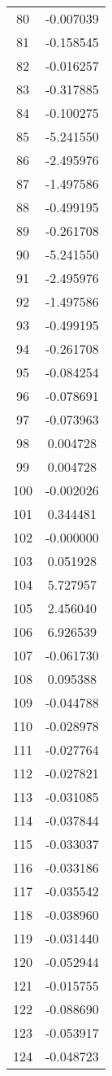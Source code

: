 \documentclass[12pt]{article}
\begin{document}
\begin{longtable}{@{}cc@{}}
80 & -0.007039 \\
81 & -0.158545 \\
82 & -0.016257 \\
83 & -0.317885 \\
84 & -0.100275 \\
85 & -5.241550 \\
86 & -2.495976 \\
87 & -1.497586 \\
88 & -0.499195 \\
89 & -0.261708 \\
90 & -5.241550 \\
91 & -2.495976 \\
92 & -1.497586 \\
93 & -0.499195 \\
94 & -0.261708 \\
95 & -0.084254 \\
96 & -0.078691 \\
97 & -0.073963 \\
98 & 0.004728 \\
99 & 0.004728 \\
100 & -0.002026 \\
101 & 0.344481 \\
102 & -0.000000 \\
103 & 0.051928 \\
104 & 5.727957 \\
105 & 2.456040 \\
106 & 6.926539 \\
107 & -0.061730 \\
108 & 0.095388 \\
109 & -0.044788 \\
110 & -0.028978 \\
111 & -0.027764 \\
112 & -0.027821 \\
113 & -0.031085 \\
114 & -0.037844 \\
115 & -0.033037 \\
116 & -0.033186 \\
117 & -0.035542 \\
118 & -0.038960 \\
119 & -0.031440 \\
120 & -0.052944 \\
121 & -0.015755 \\
122 & -0.088690 \\
123 & -0.053917 \\
124 & -0.048723 \\

\end{longtable}
\end{document}
